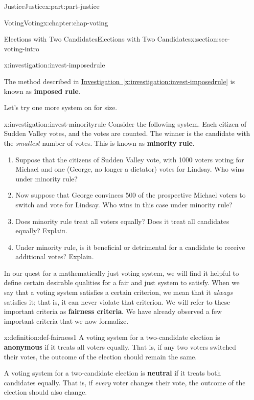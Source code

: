 \documentclass[oneside,10pt,]{book}
\newcommand{\xreffont}{\relax}
\newcommand{\terminology}[1]{\textbf{#1}}
\numberwithin{equation}{section}
\begin{document}
\begin{partptx}{Justice}{}{Justice}{}{}{x:part:part-justice}
\begin{chapterptx}{Voting}{}{Voting}{}{}{x:chapter:chap-voting}
\begin{sectionptx}{Elections with Two Candidates}{}{Elections with Two Candidates}{}{}{x:section:sec-voting-intro}
\begin{investigation}{}{x:investigation:invest-imposedrule}
\end{investigation}%
The method described in \hyperref[x:investigation:invest-imposedrule]{Investigation~{\xreffont\ref{x:investigation:invest-imposedrule}}} is known as \terminology{imposed rule}.%
\par
Let's try one more system on for size.%
\begin{investigation}{}{x:investigation:invest-minorityrule}%
Consider the following system. Each citizen of Sudden Valley votes, and the votes are counted. The winner is the candidate with the \emph{smallest} number of votes. This is known as \terminology{minority rule}.%
%
\begin{enumerate}
\item{}Suppose that the citizens of Sudden Valley vote, with 1000 voters voting for Michael and one (George, no longer a dictator) votes for Lindsay. Who wins under minority rule?%
\item{}Now suppose that George convinces 500 of the prospective Michael voters to switch and vote for Lindsay. Who wins in this case under minority rule?%
\item{}Does minority rule treat all voters equally? Does it treat all candidates equally? Explain.%
\item{}Under minority rule, is it beneficial or detrimental for a candidate to receive additional votes? Explain.%
\end{enumerate}
\end{investigation}%
 In our quest for a mathematically just voting system, we will find it helpful to define certain desirable qualities for a fair and just system to satisfy. When we say that a voting system satisfies a certain criterion, we mean that it \emph{always} satisfies it; that is, it can never violate that criterion. We will refer to these important criteria as \terminology{fairness criteria}. We have already observed a few important criteria that we now formalize.%
\begin{definition}{}{x:definition:def-fairness1}%
%
%
%
A voting system for a two-candidate election is \terminology{anonymous} if it treats all voters equally. That is, if any two voters switched their votes, the outcome of the election should remain the same.%
\par
A voting system for a two-candidate election is \terminology{neutral} if it treats both candidates equally. That is, if \emph{every} voter changes their vote, the outcome of the election should also change.%

\end{definition}
\end{sectionptx}
\end{chapterptx}
\end{partptx}
\end{document}

